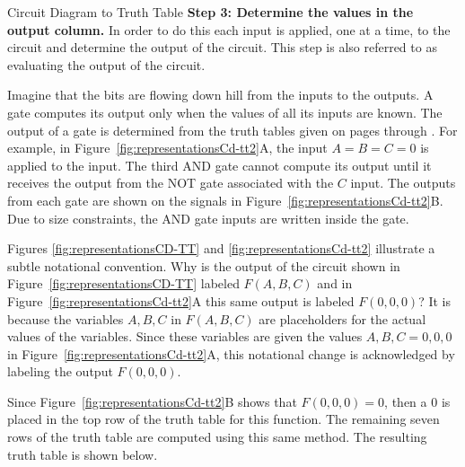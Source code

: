 \begin{process}{Circuit Diagram to Truth Table}
\textbf{Step 3: Determine the values in the output column. }
In order to do this each input is applied, one at a time, to 
the circuit and determine the output of the circuit.  This step is also
referred to as evaluating the output of the circuit.  

Imagine that 
the bits are flowing down hill from the inputs to the outputs.  A 
gate computes its output only when the values of all its inputs
are known.  The output of a gate is determined from the truth tables
given on pages \pageref{page:elf1} through \pageref{page:elf2}.  For example,
in Figure~\ref{fig:representationsCd-tt2}A, the input $A=B=C=0$ is applied
to the input.  The third AND gate cannot compute its output until
it receives the output from the NOT gate associated with the $C$ 
input.  The outputs from each gate are shown on the signals in
Figure~\ref{fig:representationsCd-tt2}B.  Due to size constraints, the AND gate 
inputs are written inside the gate.  


{\setlength{\fboxsep}{0pt}
\centering  
{}
\par}\vspace{0.2cm}


Figures \ref{fig:representationsCD-TT} and \ref{fig:representationsCd-tt2} 
illustrate a subtle notational convention. 
Why is the output of the circuit shown in Figure~\ref{fig:representationsCD-TT} 
labeled $F(A,B,C)$ and in Figure~\ref{fig:representationsCd-tt2}A this same output is
labeled  $F(0,0,0)$?  It is because the variables $A,B,C$ in $F(A,B,C)$ 
are placeholders for the actual values of the variables.  Since these
variables are given the values $A,B,C = 0,0,0$ in Figure~\ref{fig:representationsCd-tt2}A, 
this notational change is acknowledged by labeling the output $F(0,0,0)$.

Since Figure~\ref{fig:representationsCd-tt2}B shows that $F(0,0,0) = 0$, then
a 0 is placed in the top row of the truth table for this 
function.  The remaining seven rows of the truth table are computed 
using this same method.  The resulting truth table is shown below.


\end{process}
